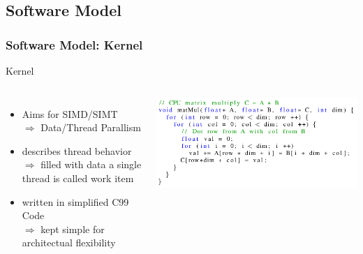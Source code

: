 \documentclass{beamer}
\begin{document}
\subsection{Software Model}
\begin{frame}
    \frametitle{Software Model: Kernel}
        Kernel
        \begin{columns}
            \begin{itemize}
            \item Aims for SIMD/SIMT\\
            $\Rightarrow$ Data/Thread Parallism
            \item describes thread behavior\\
            $\Rightarrow$ filled with data a single thread is called work item
            \item written in simplified C99 Code\\
            $\Rightarrow$ kept simple for architectual flexibility
            \end{itemize} 
            \includegraphics[width=\textwidth]{res/CodeExample.png}   
    \end{columns}
\end{frame}
\end{document}
